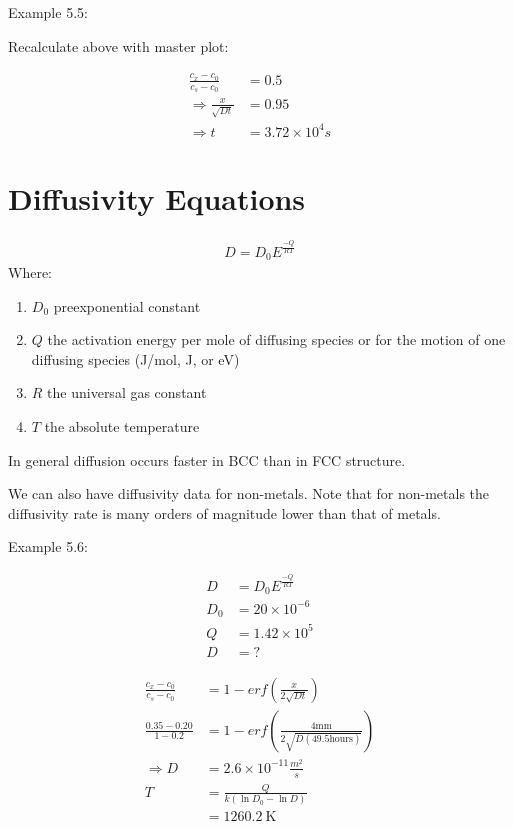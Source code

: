 \documentclass{article}
\begin{document}
Example 5.5:

Recalculate above with master plot:

\begin{equation}
    \begin{split}
        \frac{c_x -c_0}{c_s - c_0} &= 0.5 \\
        \Rightarrow \frac{x}{\sqrt{Dt}} &= 0.95 \\
        \Rightarrow t &= 3.72\times 10^4s
    \end{split}
\end{equation}


\section{Diffusivity Equations}

\begin{equation}
    \begin{split}
        D = D_0 E^{\frac{-Q}{RT}}
    \end{split}
\end{equation}
Where:
\begin{enumerate}
    \item $D_0$ preexponential constant
    \item $Q$ the activation energy per mole of diffusing species or for the motion of one diffusing species (J/mol, J, or eV)
    \item $R$ the universal gas constant
    \item $T$ the absolute temperature
\end{enumerate}
In general diffusion occurs faster in BCC than in FCC structure.

We can also have diffusivity data for non-metals. Note that for non-metals the diffusivity rate is many orders of magnitude lower than that of metals.

Example 5.6:

\begin{equation}
    \begin{split}
        D &= D_0 E^{\frac{-Q}{RT}} \\
        D_0 &= 20 \times 10^{-6} \\
        Q &= 1.42 \times 10^5 \\
        D &= ?
    \end{split}
\end{equation}

\begin{equation}
    \begin{split}
        \frac{c_x -c_0}{c_s - c_0} &= 1 - \textit{erf}(\frac{x}{2\sqrt{Dt}}) \\
        \frac{0.35-0.20}{1-0.2} &= 1 - \textit{erf}(\frac{4 \text{mm}}{2\sqrt{D(49.5\text{hours})}}) \\
        \Rightarrow D &= 2.6 \times 10^{-11} \frac{m^2}{s} \\
        T &= \frac{Q}{k ( \ln D_0 - \ln D)} \\
        &= \SI{1260.2}{\kelvin}
    \end{split}
\end{equation}
\end{document}
